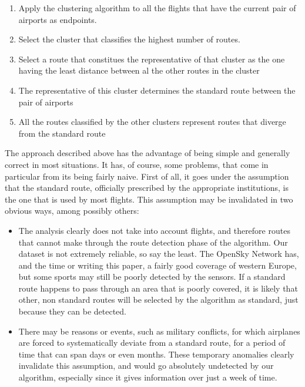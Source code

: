 \documentclass{vldb}
\begin{document}
\begin{enumerate}
  \item Apply the clustering algorithm to all the flights that have the
  current pair of airports as endpoints.
  \item Select the cluster that classifies the highest number of routes.
  \item Select a route that constitues the representative of
  that cluster as the one having the least distance between al the other
  routes in the cluster
  \item The representative of this cluster determines the standard route
  between the pair of airports
  \item All the routes classified by the other clusters represent routes that
  diverge from the standard route
\end{enumerate}

The approach described above has the advantage of being simple and generally
correct in most situations. It has, of course, some problems, that come in
particular from its being fairly naive. First of all, it goes under the
assumption that the standard route, officially prescribed by the
appropriate institutions, is the one that is used by most flights. This
assumption may be invalidated in two obvious ways, among possibly others:

\begin{itemize}
  \item The analysis clearly does not take into account flights, and therefore
  routes that cannot make through the route detection phase of the algorithm.
  Our dataset is not extremely reliable, so say the least. The OpenSky Network
  has, and the time or writing this paper, a fairly good coverage of western
  Europe, but some sports may still be poorly detected by the sensors. If a
  standard route happens to pass through an area that is poorly covered, it is
  likely that other, non standard routes will be selected by the algorithm as
  standard, just because they can be detected.
  \item There may be reasons or events, such as military conflicts, for which
  airplanes are forced to systematically deviate from a standard route, for a
  period of time that can span days or even months. These temporary anomalies
  clearly invalidate this assumption, and would go absolutely undetected by our
  algorithm, especially since it gives information over just a week of time.
\end{itemize}
\end{document}
